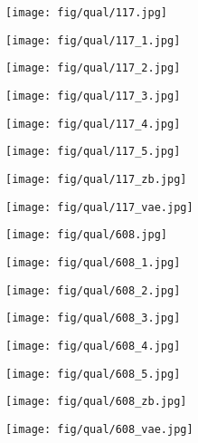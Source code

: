 \documentclass[10pt,twocolumn,letterpaper]{article}
\newcommand{\sze}{0.13}
\newcommand{\szle}{0.08}
\begin{document}
\begin{figure*}
\begin{subfigure}[c]{\sze\linewidth}
\texttt{[image: fig/qual/117.jpg]}
\end{subfigure}
\begin{subfigure}[c]{\sze\linewidth}
\texttt{[image: fig/qual/117\_1.jpg]}
\end{subfigure}
\begin{subfigure}[c]{\sze\linewidth}
\texttt{[image: fig/qual/117\_2.jpg]}
\end{subfigure}
\begin{subfigure}[c]{\sze\linewidth}
\texttt{[image: fig/qual/117\_3.jpg]}
\end{subfigure}
\begin{subfigure}[c]{\sze\linewidth}
\texttt{[image: fig/qual/117\_4.jpg]}
\end{subfigure}
\hspace{3pt}
\begin{subfigure}[c]{\sze\linewidth}
\texttt{[image: fig/qual/117\_5.jpg]}
\end{subfigure}
\begin{subfigure}[c]{\szle\linewidth}
\texttt{[image: fig/qual/117\_zb.jpg]}
\end{subfigure}
\hspace{3pt}
\begin{subfigure}[c]{\szle\linewidth}
\texttt{[image: fig/qual/117\_vae.jpg]}
\end{subfigure}

\begin{subfigure}[c]{\sze\linewidth}
\texttt{[image: fig/qual/608.jpg]}
\end{subfigure}
\begin{subfigure}[c]{\sze\linewidth}
\texttt{[image: fig/qual/608\_1.jpg]}
\end{subfigure}
\begin{subfigure}[c]{\sze\linewidth}
\texttt{[image: fig/qual/608\_2.jpg]}
\end{subfigure}
\begin{subfigure}[c]{\sze\linewidth}
\texttt{[image: fig/qual/608\_3.jpg]}
\end{subfigure}
\begin{subfigure}[c]{\sze\linewidth}
\texttt{[image: fig/qual/608\_4.jpg]}
\end{subfigure}
\hspace{3pt}
\begin{subfigure}[c]{\sze\linewidth}
\texttt{[image: fig/qual/608\_5.jpg]}
\end{subfigure}
\begin{subfigure}[c]{\szle\linewidth}
\texttt{[image: fig/qual/608\_zb.jpg]}
\end{subfigure}
\hspace{3pt}
\begin{subfigure}[c]{\szle\linewidth}
\texttt{[image: fig/qual/608\_vae.jpg]}
\end{subfigure}


\end{figure*}
\end{document}
